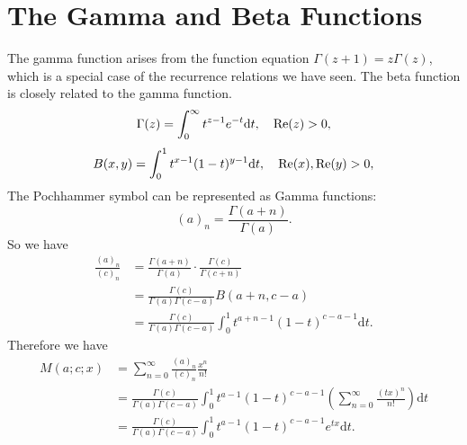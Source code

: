 \documentclass[../main.tex]{subfiles}
\begin{document}
\section{The Gamma and Beta Functions}

The gamma function arises from the function equation $\Gamma(z+1) = z \Gamma(z)$, which is a special case of the recurrence relations we have seen. The beta function is closely related to the gamma function.
\begin{equation*}
	\Gamma(z) = \int_0^{\infty} t^{z-1} e^{-t} \mathrm{d} t, \quad \operatorname{Re}(z) > 0,
\end{equation*}
\begin{equation*}
	B(x,y) = \int_0^1 t^{x-1} (1-t)^{y-1} \mathrm{d} t, \quad \operatorname{Re}(x), \operatorname{Re}(y) > 0,
\end{equation*}
The Pochhammer symbol can be represented as Gamma functions:
\begin{equation}
	(a)_n = \frac{\Gamma(a+n)}{\Gamma(a)}.
\end{equation}
So we have
\begin{equation*}
	\begin{aligned}
		\frac{(a)_n}{(c)_n} &= \frac{\Gamma(a+n)}{\Gamma(a)} \cdot \frac{\Gamma(c)}{\Gamma(c+n)}\\
				    &= \frac{\Gamma(c)}{\Gamma(a) \Gamma(c-a)} B(a+n, c-a) \\
				    &= \frac{\Gamma(c)}{\Gamma(a) \Gamma(c-a)} \int_0^1 t^{a+n-1} (1-t)^{c-a-1} \mathrm{d} t.
	\end{aligned}
\end{equation*}
Therefore we have
\begin{equation}
	\begin{aligned}
		M(a; c; x) &= \sum_{n=0}^{\infty} \frac{(a)_n}{(c)_n} \frac{x^n}{n!} \\
			    &= \frac{\Gamma(c)}{\Gamma(a) \Gamma(c-a)} \int_0^1 t^{a-1} (1-t)^{c-a-1} \left( \sum_{n=0}^{\infty} \frac{(t x)^n}{n!} \right) \mathrm{d} t \\
			    &= \frac{\Gamma(c)}{\Gamma(a) \Gamma(c-a)} \int_0^1 t^{a-1} (1-t)^{c-a-1} e^{t x} \mathrm{d} t.
	\end{aligned}
\end{equation}
\end{document}
